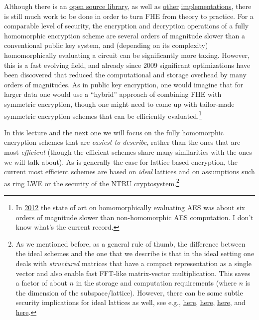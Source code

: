 Although there is an \href{http://shaih.github.io/HElib/}{open source
library}, as well as
\href{https://www.dcsec.uni-hannover.de/fileadmin/ful/mitarbeiter/brenner/wahc14_RC.pdf}{other}
\href{https://eprint.iacr.org/2014/816}{implementations}, there is still
much work to be done in order to turn FHE from theory to practice. For a
comparable level of security, the encryption and decryption operations
of a fully homomorphic encryption scheme are several orders of magnitude
slower than a conventional public key system, and (depending on its
complexity) homomorphically evaluating a circuit can be significantly
more taxing. However, this is a fast evolving field, and already since
2009 significant optimizations have been discovered that reduced the
computational and storage overhead by many orders of magnitudes. As in
public key encryption, one would imagine that for larger data one would
use a ``hybrid'' approach of combining FHE with symmetric encryption,
though one might need to come up with tailor-made symmetric encryption
schemes that can be efficiently evaluated.\footnote{In
  \href{https://eprint.iacr.org/2012/099.pdf}{2012} the state of art on
  homomorphically evaluating AES was about six orders of magnitude
  slower than non-homomorphic AES computation. I don't know what's the
  current record.}

In this lecture and the next one we will focus on the fully homomorphic
encryption schemes that are \emph{easiest to describe}, rather than the
ones that are most \emph{efficient} (though the efficient schemes share
many similarities with the ones we will talk about). As is generally the
case for lattice based encryption, the current most efficient schemes
are based on \emph{ideal} lattices and on assumptions such as ring LWE
or the security of the NTRU cryptosystem.\footnote{As we mentioned
  before, as a general rule of thumb, the difference between the ideal
  schemes and the one that we describe is that in the ideal setting one
  deals with \emph{structured} matrices that have a compact
  representation as a single vector and also enable fast FFT-like
  matrix-vector multiplication. This saves a factor of about \(n\) in
  the storage and computation requirements (where \(n\) is the dimension
  of the subspace/lattice). However, there can be some subtle security
  implications for ideal lattices as well, see e.g.,
  \href{https://eprint.iacr.org/2016/127}{here},
  \href{https://eprint.iacr.org/2015/313}{here},
  \href{https://eprint.iacr.org/2016/139}{here}, and
  \href{https://eprint.iacr.org/2015/676}{here}.}

